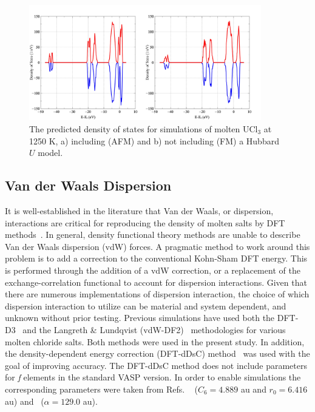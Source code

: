 \documentclass[preprint,3p,10pt,onecolumn,number,sort&compress]{elsarticle}
\begin{document}
{\begin{figure}[h]
\centering
\includegraphics[width=0.9\textwidth]{fig2.jpg}
\caption{The predicted density of states for simulations of molten UCl$_3$ at 1250 K, a) including (AFM) and b) not including (FM) a Hubbard $U$ model.} 
\label{fig:DOS}
\end{figure}


\subsection{Van der Waals Dispersion}

It is well-established in the literature that Van der Waals, or dispersion, interactions are critical for reproducing the density of molten salts by DFT methods~\cite{Li,Nam2014,Nam2015}. In general, density functional theory methods are unable to describe Van der Waals dispersion (vdW) forces. A pragmatic method to work around this problem is to add a correction to the conventional Kohn-Sham DFT energy. This is performed through the addition of a vdW correction, or a replacement of the exchange-correlation functional to account for dispersion interactions. Given that there are numerous implementations of dispersion interaction, the choice of which dispersion interaction to utilize can be material and system dependent, and unknown without prior testing. Previous simulations have used both the DFT-D3~\cite{Li,Grimme} and the Langreth \& Lundqvist (vdW-DF2)~\cite{Nam2015,Dion,Klimes} methodologies for various molten chloride salts. Both methods were used in the present study. In addition, the density-dependent energy correction (DFT-dDsC) method~\cite{Steinmann2011,Steinmann2} was used with the goal of improving accuracy. The DFT-dDsC method does not include parameters for \textit{f} elements in the standard VASP version. In order to enable simulations the corresponding parameters were taken from Refs. ~\cite{Kim} ($C_6=4.889$ au and $r_0=6.416$ au) and~\cite{pol} ($\alpha=129.0$ au). %

}
\end{document}
